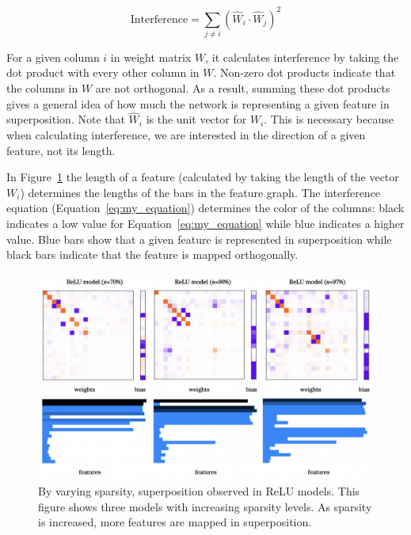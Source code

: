 \documentclass{article} %
\begin{document}
\begin{equation}
\label{eq:my_equation}
\text{Interference} = \sum_{j \neq i} (\hat{W}_i \cdot \hat{W}_j)^2
\end{equation}

For a given column $i$ in weight matrix $W$, it calculates interference by taking
the dot product with every other column in $W$. Non-zero dot products indicate
that the columns in $W$ are not orthogonal. As a result, summing these dot 
products gives a general idea of how much the network is representing a given
feature in superposition. Note that $\hat{W}_i$ is the unit vector for $W_i$. 
This is necessary because when calculating interference, we are interested in
the direction of a given feature, not its length.\newline

In Figure~\ref{fig:sparsity_1} the length of a feature (calculated by taking the
length of the vector $W_i$) determines the lengths of the bars in the feature
graph. The interference equation (Equation~\ref{eq:my_equation}) determines the
color of the columns: black indicates a low value for Equation~\ref{eq:my_equation}
while blue indicates a higher value. Blue bars show that a given feature is represented
in superposition while black bars indicate that the feature is mapped orthogonally.
    

\begin{figure}[h]
    \centering
    \includegraphics[width=0.85\linewidth]{demonstrating_superposition/images/sparsity_superposition1.png}
    \captionsetup{font=footnotesize, width=0.7\linewidth} %
    \caption{
        By varying sparsity, superposition observed in ReLU models. This figure
        shows three models with increasing sparsity levels. As sparsity is increased, 
        more features are mapped in superposition.
    }
    \label{fig:sparsity_1}
\end{figure}
\end{document}
